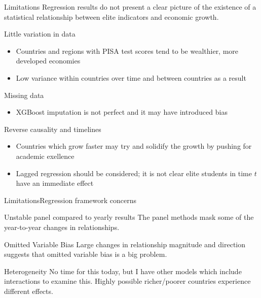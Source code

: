 \documentclass[10pt]{beamer}
\begin{document}
\begin{frame}{Limitations}
    Regression results do not present a clear picture of the existence of a statistical relationship between elite indicators and economic growth.
    \begin{block}{Little variation in data}
        \begin{itemize}
            \item Countries and regions with PISA test scores tend to be wealthier, more developed economies
            \item Low variance within countries over time and between countries as a result
        \end{itemize}
    \end{block}

    \begin{block}{Missing data}
        \begin{itemize}
            \item XGBoost imputation is not perfect and it may have introduced bias
        \end{itemize}
    \end{block}

    \begin{block}{Reverse causality and timelines}
        \begin{itemize}
            \item Countries which grow faster may try and solidify the growth by pushing for academic exellence
            \item Lagged regression should be considered; it is not clear elite students in time $t$ have an immediate effect
        \end{itemize}
    \end{block}
    
    
\end{frame}

\begin{frame}{Limitations}{Regression framework concerns}
    \begin{block}{Unstable panel compared to yearly results}
        The panel methods mask some of the year-to-year changes in relationships.
    \end{block}

    \begin{block}{Omitted Variable Bias}
        Large changes in relationship magnitude and direction suggests that omitted variable bias is a big problem.
    \end{block}

    \begin{block}{Heterogeneity}
        No time for this today, but I have other models which include interactions to examine this. Highly possible richer/poorer countries experience different effects.
    \end{block}
    
    
\end{frame}
\end{document}
